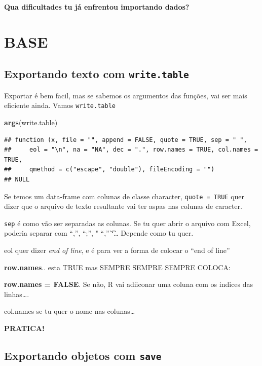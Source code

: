 \documentclass[]{book}
\newenvironment{Shaded}{\begin{snugshade}}{\end{snugshade}}
\newcommand{\KeywordTok}[1]{\textcolor[rgb]{0.13,0.29,0.53}{\textbf{#1}}}
\newcommand{\NormalTok}[1]{#1}
\theoremstyle{definition}
\theoremstyle{definition}
\theoremstyle{definition}
\theoremstyle{remark}
\begin{document}
\textbf{Qua dificultades tu já enfrentou importando dados?}

\section{BASE}\label{base}

\subsection{\texorpdfstring{Exportando texto com
\texttt{write.table}}{Exportando texto com write.table}}\label{exportando-texto-com-write.table}

Exportar é bem facil, mas se sabemos os argumentos das funções, vai ser
mais eficiente ainda. Vamos \texttt{write.table}

\begin{Shaded}
\begin{Highlighting}[]
\KeywordTok{args}\NormalTok{(write.table)}
\end{Highlighting}
\end{Shaded}

\begin{verbatim}
## function (x, file = "", append = FALSE, quote = TRUE, sep = " ", 
##     eol = "\n", na = "NA", dec = ".", row.names = TRUE, col.names = TRUE, 
##     qmethod = c("escape", "double"), fileEncoding = "") 
## NULL
\end{verbatim}

Se temos um data-frame com colunas de classe character,
\texttt{quote\ =\ TRUE} quer dizer que o arquivo de texto resultante vai
ter aspas nas colunas de caracter.

\texttt{sep} é como vão ser separadas as colunas. Se tu quer abrir o
arquivo com Excel, poderia separar com ``,'', ``;'', " ``,''\t``\ldots{}
Depende como tu quer.

eol quer dizer \emph{end of line}, e é para ver a forma de colocar o
``end of line''

\textbf{row.names}.. esta TRUE mas SEMPRE SEMPRE SEMPRE COLOCA:

\textbf{row.names = FALSE}. Se não, R vai adiiconar uma coluna com os
indices das linhas\ldots{}.

col.names se tu quer o nome nas colunas\ldots{}

\textbf{PRATICA!}

\subsection{\texorpdfstring{Exportando objetos com
\texttt{save}}{Exportando objetos com save}}\label{exportando-objetos-com-save}
\end{document}
